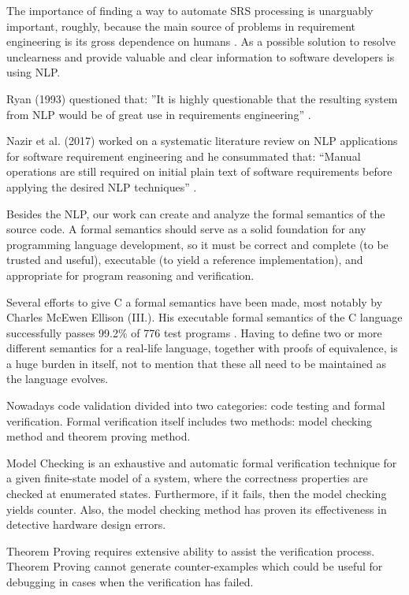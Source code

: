 \begin{multicols}{2}
	The importance of finding a way to automate \gls{SRS} processing is unarguably important, roughly, because the main source of problems in requirement engineering is its gross dependence on humans \cite{Ahmed}. As a possible solution to resolve unclearness and provide valuable and clear information to software developers is using \gls{NLP}.
	
	Ryan (1993) questioned that: ”It is highly questionable that the resulting system from \gls{NLP} would be of great use in requirements engineering” \cite{Ryan}.
	
	Nazir et al. (2017) worked on a systematic literature review on \gls{NLP} applications for software requirement engineering and he consummated that: “Manual operations are still required on initial plain text of software requirements before applying the desired \gls{NLP} techniques” \cite{Nazir}.
	
	Besides the \gls{NLP}, our work can create and analyze the formal semantics of the source code.  A formal semantics should serve as a solid foundation for any programming language development, so it must be correct and complete (to be trusted and useful), executable (to yield a reference implementation), and appropriate for program reasoning and verification.
	
	Several efforts to give C a formal semantics have been made, most notably by Charles McEwen Ellison (III.). His executable formal semantics of the C language successfully passes  99.2\% of 776 test programs \cite{Ellison:2012:EFS:2103621.2103719}. Having to define two or more different semantics for a real-life language, together with proofs of equivalence, is a huge burden in itself, not to mention that these all need to be maintained as the language evolves.
	
	Nowadays code validation divided into two categories: code testing and formal verification. Formal verification itself includes two methods: model checking method and theorem proving method.
	
	Model Checking \cite{Clarke:2000:MC:332656} is an exhaustive and automatic formal verification technique for a given finite-state model of a system, where the correctness properties are checked at enumerated states. Furthermore, if it fails, then the model checking yields counter. Also, the model checking method has proven its effectiveness in detective hardware design errors.
	
	Theorem Proving requires extensive ability to assist the verification process. Theorem Proving cannot generate counter-examples which could be useful for debugging in cases when the verification has failed.
	

\end{multicols}
